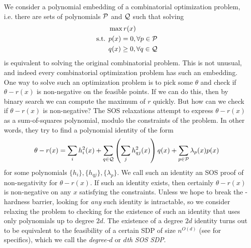 We consider a polynomial embedding of a combinatorial optimization problem, i.e. there are sets of polynomials $\mathcal P$ and $\mathcal Q$ such that solving
\begin{align*}
&\max r(x) \\
\text{s.t. } &p(x) = 0, \forall p \in \mathcal P \\
&q(x) \geq 0, \forall q \in \mathcal Q
\end{align*}
is equivalent to solving the original combinatorial problem. This is not unusual, and indeed every combinatorial optimization problem has such an embedding. One way to solve such an optimization problem is to pick some $\theta$ and check if $\theta - r(x)$ is non-negative on the feasible points. If we can do this, then by binary search we can compute the maximum of $r$ quickly. But how can we check if $\theta - r(x)$ is non-negative? The SOS relaxations attempt to express $\theta - r(x)$ as a sum-of-squares polynomial, modulo the constraints of the problem. In other words, they try to find a polynomial identity of the form
\[\theta - r(x) = \sum_i h_i^2(x) + \sum_{q \in \mathcal Q} \left(\sum_j h_{qj}^2(x)\right)q(x) + \sum_{p\in\mathcal P} \lambda_p(x)p(x)\label{eq:intro_sos_proof}\]
for some polynomials $\{h_i\}, \{h_{qj}\}, \{\lambda_p\}$.
We call such an identity an SOS proof of non-negativity for $\theta - r(x)$.
If such an identity exists, then certainly $\theta - r(x)$ is non-negative on any $x$ satisfying the constraints. Unless we hope to break the \np-hardness barrier, looking for \emph{any} such identity is intractable, so we consider relaxing the problem to checking for the existence of such an identity that uses only polynomials up to degree $2d$. The existence of a degree $2d$ identity turns out to be equivalent to the feasibility of a certain SDP of size $n^{O(d)}$ (see  for specifics), which we call the \emph{degree-$d$} or \emph{$d$th SOS SDP}.

